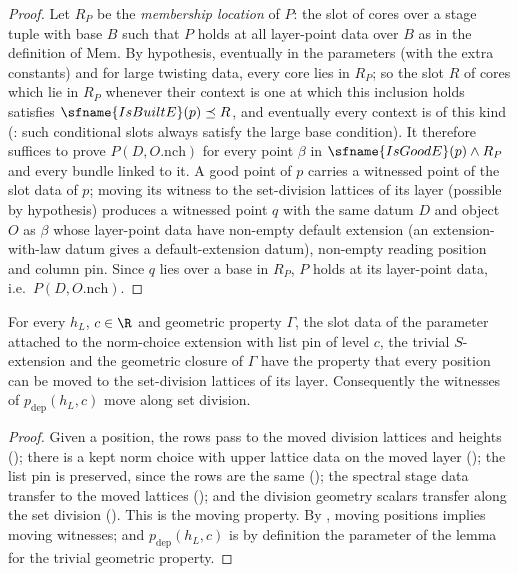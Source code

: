 \begin{proof}
Let $R_P$ be the \emph{membership location} of $P$: the slot of cores over a stage tuple with base $B$ such that $P$ holds at all
layer-point data over $B$ as in the definition of $\mathrm{Mem}$. By hypothesis, eventually in the parameters (with the extra
constants) and for large twisting data, every core lies in $R_P$; so the slot $R$ of cores which lie in $R_P$ whenever their
context is one at which this inclusion holds satisfies $\sfname{IsBuiltE}(p)\preceq R$, and eventually every context is of this kind
(: such conditional slots always satisfy the large base condition).
It therefore suffices to prove $P(D,O.\mathrm{nch})$ for every point $\beta$ in $\sfname{IsGoodE}(p)\wedge R_P$ and every bundle linked
to it. A good point of $p$ carries a witnessed point of the slot data of $p$; moving its witness to the set-division lattices of its
layer (possible by hypothesis) produces a witnessed point $q$ with the same datum $D$ and object $O$ as $\beta$ whose layer-point data
have non-empty default extension (an extension-with-law datum gives a default-extension datum), non-empty reading position and
column pin. Since $q$ lies over a base in $R_P$, $P$ holds at its layer-point data, i.e.\ $P(D,O.\mathrm{nch})$.
\end{proof}

\begin{lemma}\label{pf:linkN:moving}
For every $h_L$, $c\in\R$ and geometric property $\Gamma$, the slot data of the parameter attached to the norm-choice extension with
list pin of level $c$, the trivial $S$-extension and the geometric closure of $\Gamma$ have the property that every position can be
moved to the set-division lattices of its layer. Consequently the witnesses of $p_{\mathrm{dep}}(h_L,c)$ move along
set division.
\end{lemma}

\begin{proof}
Given a position, the rows pass to the moved division lattices and heights
(); there is a kept norm choice with upper lattice data on the
moved layer (); the list pin is preserved, since the rows are the same
(); the spectral stage data transfer to the moved lattices
(); and the division geometry scalars transfer along the set
division (). This is the moving property. By
, moving positions implies moving witnesses; and
$p_{\mathrm{dep}}(h_L,c)$ is by definition the parameter of the lemma for the trivial geometric property.
\end{proof}

